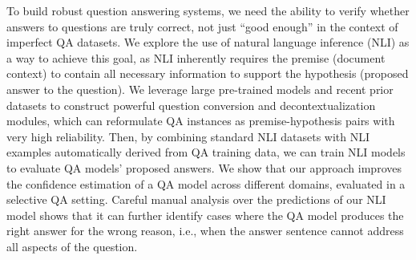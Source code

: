 To build robust question answering systems, we need the ability to verify whether answers to questions are truly correct, not just ``good enough'' in the context of imperfect QA datasets. We explore the use of natural language inference (NLI) as a way to achieve this goal, as NLI inherently requires the premise (document context) to contain all necessary information to support the hypothesis (proposed answer to the question). We leverage large pre-trained models and recent prior datasets to construct powerful question conversion and decontextualization modules, which can reformulate QA instances as premise-hypothesis pairs with very high reliability. Then, by combining standard NLI datasets with NLI examples automatically derived from QA training data, we can train NLI models to evaluate QA models' proposed answers. We show that our approach improves the confidence estimation of a QA model across different domains, evaluated in a selective QA setting. Careful manual analysis over the predictions of our NLI model shows that it can further identify cases where the QA model produces the right answer for the wrong reason, i.e., when the answer sentence cannot address all aspects of the question.
